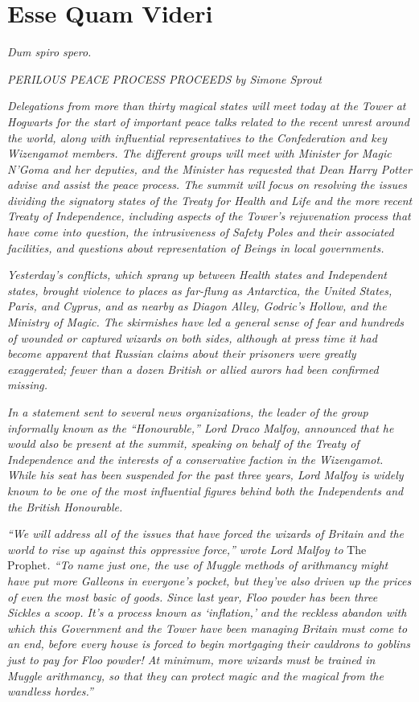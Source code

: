 \hypertarget{esse-quam-videri}{%
\chapter{Esse Quam Videri}\label{esse-quam-videri}}

\emph{Dum spiro spero.}

\mybreak

\emph{PERILOUS PEACE PROCESS PROCEEDS} \emph{by Simone Sprout}

\emph{Delegations from more than thirty magical states will meet today
at the Tower at Hogwarts for the start of important peace talks related
to the recent unrest around the world, along with influential
representatives to the Confederation and key Wizengamot members. The
different groups will meet with Minister for Magic N'Goma and her
deputies, and the Minister has requested that Dean Harry Potter advise
and assist the peace process. The summit will focus on resolving the
issues dividing the signatory states of the Treaty for Health and Life
and the more recent Treaty of Independence, including aspects of the
Tower's rejuvenation process that have come into question, the
intrusiveness of Safety Poles and their associated facilities, and
questions about representation of Beings in local governments.}

\emph{Yesterday's conflicts, which sprang up between Health states and
Independent states, brought violence to places as far-flung as
Antarctica, the United States, Paris, and Cyprus, and as nearby as
Diagon Alley, Godric's Hollow, and the Ministry of Magic. The skirmishes
have led a general sense of fear and hundreds of wounded or captured
wizards on both sides, although at press time it had become apparent
that Russian claims about their prisoners were greatly exaggerated;
fewer than a dozen British or allied aurors had been confirmed missing.}

\emph{In a statement sent to several news organizations, the leader of
the group informally known as the ``Honourable,'' Lord Draco Malfoy,
announced that he would also be present at the summit, speaking on
behalf of the Treaty of Independence and the interests of a conservative
faction in the Wizengamot. While his seat has been suspended for the
past three years, Lord Malfoy is widely known to be one of the most
influential figures behind both the Independents and the British
Honourable.}

\emph{``We will address all of the issues that have forced the wizards
of Britain and the world to rise up against this oppressive force,''
wrote Lord Malfoy to} The Prophet\emph{. ``To name just one, the use of
Muggle methods of arithmancy might have put more Galleons in everyone's
pocket, but they've also driven up the prices of even the most basic of
goods. Since last year, Floo powder has been three Sickles a scoop. It's
a process known as `inflation,' and the reckless abandon with which this
Government and the Tower have been managing Britain must come to an end,
before every house is forced to begin mortgaging their cauldrons to
goblins just to pay for Floo powder! At minimum, more wizards must be
trained in Muggle arithmancy, so that they can protect magic and the
magical from the wandless hordes.''}

